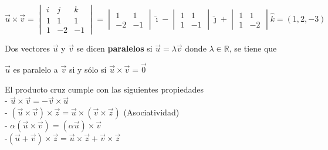 \documentclass{article}
\theoremstyle{plain}
\theoremstyle{definition}
\begin{document}
\begin{center}
$ \overrightarrow{u} \times \overrightarrow{v} = \begin{vmatrix}
i & j & k\\
1 & 1 & 1\\
1 & -2 & -1
\end{vmatrix} =  \begin{vmatrix}
1 & 1 \\
-2 & -1
\end{vmatrix} \hat{\imath}- \begin{vmatrix}
1 & 1 \\
1 & -1
\end{vmatrix} \hat{\jmath} + \begin{vmatrix}
1 & 1 \\
1 & -2
\end{vmatrix} \hat{k} = (1,2,-3)$
\end{center}


Dos vectores $\overrightarrow{u} $ y $\overrightarrow{v} $ se dicen \textbf{paralelos } si $\overrightarrow{u} = \lambda \overrightarrow{v} $ donde $\lambda \in \mathbb{R}$, se tiene que

\begin{center}
$\overrightarrow{u} $ es paralelo a $\overrightarrow{v}$ si y sólo sí $\overrightarrow{u} \times \overrightarrow{v} = \overrightarrow{0}  $
\end{center}

\newpage

El producto cruz cumple con las siguientes propiedades \\

- $\overrightarrow{u} \times \overrightarrow{v} = - \overrightarrow{v} \times \overrightarrow{u} $ \\


- $(\overrightarrow{u} \times \overrightarrow{v}) \times \overrightarrow{z} = \overrightarrow{u} \times ( \overrightarrow{v} \times \overrightarrow{z} ) $ (Asociatividad) \\

- $\alpha (\overrightarrow{u} \times \overrightarrow{v}) = (\alpha \overrightarrow{u}) \times \overrightarrow{v}$ \\

-$(\overrightarrow{u}+\overrightarrow{v}) \times \overrightarrow{z} = \overrightarrow{u} \times \overrightarrow{z} +\overrightarrow{v} \times \overrightarrow{z}$ \\
\end{document}
